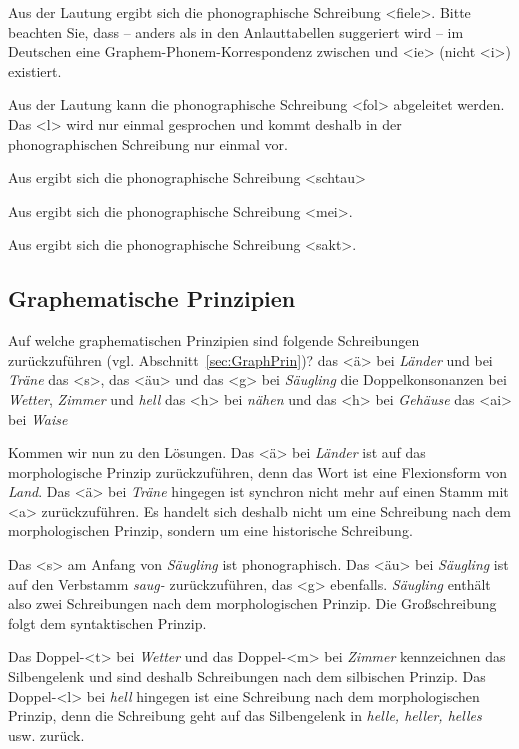 Aus der Lautung \textipa{[\textprimstress fi:.l@]} ergibt sich die phonographische Schreibung <fiele>. Bitte beachten Sie, dass -- anders als in den Anlauttabellen suggeriert wird -- im Deutschen eine Graphem-Phonem-Korrespondenz zwischen  und <ie> (nicht <i>) existiert.

Aus der Lautung \textipa{[fOl]} kann die phonographische Schreibung <fol> abgeleitet werden. Das <l> wird nur einmal gesprochen und kommt deshalb in der phonographischen Schreibung nur einmal vor.

Aus \textipa{[StaU]} ergibt sich die phonographische Schreibung <schtau>

Aus \textipa{[maI]} ergibt sich die phonographische Schreibung <mei>.

Aus \textipa{[za:kt]} ergibt sich die phonographische Schreibung <sakt>.

\subsection{Graphematische Prinzipien}

Auf welche graphematischen Prinzipien sind folgende Schreibungen zurückzuführen (vgl. Abschnitt~\ref{sec:GraphPrin})?
\ea
\ea das <ä> bei \textit{Länder} und bei \textit{Träne}
\ex das <s>, das <äu> und das <g> bei \textit{Säugling}
\ex die Doppelkonsonanzen bei \textit{Wetter}, \textit{Zimmer} und \textit{hell}
\ex das <h> bei \textit{nähen} und das <h> bei \textit{Gehäuse}
\ex das <ai> bei \textit{Waise}
\z
\z

Kommen wir nun zu den Lösungen. Das <ä> bei \textit{Länder} ist auf das morphologische Prinzip zurückzuführen, denn das Wort ist eine Flexionsform von \textit{Land}. Das <ä> bei \textit{Träne} hingegen ist synchron nicht mehr auf einen Stamm mit <a> zurückzuführen. Es handelt sich deshalb nicht um eine Schreibung nach dem morphologischen Prinzip, sondern um eine historische Schreibung. 

Das <s> am Anfang von \textit{Säugling} ist phonographisch. Das <äu> bei \textit{Säugling} ist auf den Verbstamm \textit{saug-} zurückzuführen, das <g> ebenfalls. \textit{Säugling} enthält also zwei Schreibungen nach dem morphologischen Prinzip. Die Großschreibung folgt dem syntaktischen Prinzip.

Das Doppel-<t> bei \textit{Wetter} und das Doppel-<m> bei \textit{Zimmer} kennzeichnen das Silbengelenk und sind deshalb Schreibungen nach dem silbischen Prinzip. Das Doppel-<l> bei \textit{hell} hingegen ist eine Schreibung nach dem morphologischen Prinzip, denn die Schreibung geht auf das Silbengelenk in \textit{helle, heller, helles} usw. zurück. 

